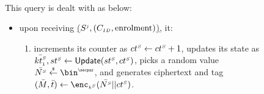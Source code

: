 \begin{figure}[H]
\setlength{\fboxsep}{1pt}
\begin{center}
    \begin{tcolorbox}[enhanced,width=4.7in, left=0.1cm,
    drop fuzzy shadow southwest,
    colframe=black,colback=white]
{\small{

 \\
 
 This query is dealt with as below: 
 
 \begin{itemize}[leftmargin=.4cm]
 \item upon receiving  \underline{\send($S^{\scriptscriptstyle j}, (C_{\scriptscriptstyle ID},  \text{enrolment})$)}, it:
 \begin{enumerate}
 \item  increments its counter as ${ct}^{\scriptscriptstyle S} \gets {ct}^{\scriptscriptstyle S} + 1$, updates its state as $\bar{{kt}^{\scriptscriptstyle S}_{\scriptscriptstyle 1}}, {st}^{\scriptscriptstyle S} \gets \mathsf{Update}({st}^{\scriptscriptstyle S}, {ct}^{\scriptscriptstyle S})$, picks a random value $\bar{\VS{\nonce}} \stackrel{\sss\$}\leftarrow \bin^{\sss\secpar}$, and generates ciphertext and tag   $(\bar M,\bar t) \gets \enc_{\sss\VS{k}}(\bar{\VS{\nonce}}|| \VS{\counter})$. 
 

\end{enumerate}
\end{itemize}}}
\end{tcolorbox}
\end{center}
\end{figure}
